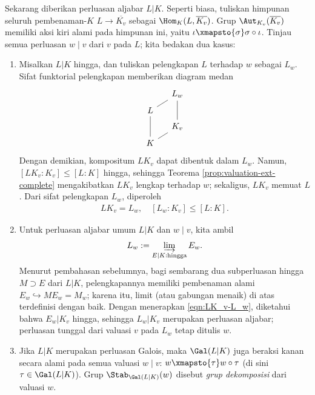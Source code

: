 Sekarang diberikan perluasan aljabar $L|K$. Seperti biasa, tuliskan himpunan seluruh pembenaman-$K$ $L \to \overline{K_v}$ sebagai $\Hom_K(L, \overline{K_v})$. Grup $\Aut_{K_v}(\overline{K_v})$ memiliki aksi kiri alami pada himpunan ini, yaitu $\iota \xmapsto{\sigma} \sigma \circ \iota$. Tinjau semua perluasan $w \mid v$ dari $v$ pada $L$; kita bedakan dua kasus:
\begin{enumerate}
	\item Misalkan $L|K$ hingga, dan tuliskan pelengkapan $L$ terhadap $w$ sebagai $L_w$. Sifat funktorial pelengkapan memberikan diagram medan
	\[\begin{tikzcd}[row sep=tiny, column sep=small]
		& L_w \\
		L \arrow[dash, ru] \arrow[dash, dd] & \\
		& K_v \arrow[dash, uu] \\
		K \arrow[dash, ru] &
	\end{tikzcd}\]
	Dengan demikian, kompositum $LK_v$ dapat dibentuk dalam $L_w$. Namun, $[LK_v : K_v] \leq [L:K]$ hingga, sehingga Teorema \ref{prop:valuation-ext-complete} mengakibatkan $LK_v$ lengkap terhadap $w$; sekaligus, $LK_v$ memuat $L$. Dari sifat pelengkapan $L_w$, diperoleh
	\begin{gather}\label{eqn:LK_v-L_w}
		LK_v = L_w, \quad [L_w:K_v] \leq [L:K].
	\end{gather}
	\item Untuk perluasan aljabar umum $L|K$ dan $w \mid v$, kita ambil
		\[ L_w := \varinjlim_{E|K: \text{hingga}} E_w. \]
		Menurut pembahasan sebelumnya, bagi sembarang dua subperluasan hingga $M \supset E$ dari $L|K$, pelengkapannya memiliki pembenaman alami $E_w \hookrightarrow ME_w = M_w$; karena itu, limit (atau gabungan menaik) di atas terdefinisi dengan baik. Dengan menerapkan \eqref{eqn:LK_v-L_w}, diketahui bahwa $E_w|K_v$ hingga, sehingga $L_w|K_v$ merupakan perluasan aljabar; perluasan tunggal dari valuasi $v$ pada $L_w$ tetap ditulis $w$.
	\item Jika $L|K$ merupakan perluasan Galois, maka $\Gal(L|K)$ juga beraksi kanan secara alami pada semua valuasi $w \mid v$: $w \xmapsto{\tau} w \circ \tau$ (di sini $\tau \in \Gal(L|K)$). Grup $\Stab_{\Gal(L|K)}(w)$ disebut \emph{grup dekomposisi} dari valuasi $w$.
\end{enumerate}

